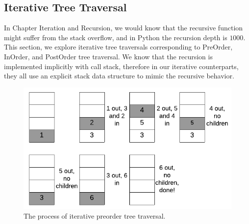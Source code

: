 \documentclass[../main.tex]{subfiles}
\begin{document}
\subsection{Iterative Tree Traversal}
In Chapter Iteration and Recursion, we would know that the recursive function might suffer from the stack overflow, and in Python the recursion depth is $1000$. This section, we explore iterative tree traversals corresponding to PreOrder, InOrder, and PostOrder tree traversal. We know that the recursion is implemented implicitly with call stack, therefore in our iterative counterparts, they all use an explicit stack data structure to mimic the recursive behavior. 
\begin{figure}[!ht]
    \centering
    \includegraphics[width = .9\columnwidth]{fig/iterative_tree_traversal_preorder.png}
    \caption{The process of iterative preorder tree traversal.}
    \label{fig:iterative_tree_traveral_preorder}
\end{figure}
\end{document}
